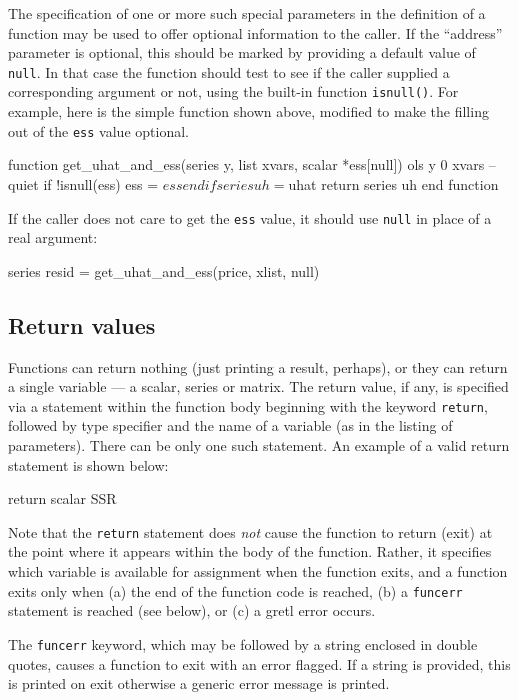 The specification of one or more such special parameters in the
definition of a function may be used to offer optional information to
the caller.  If the ``address'' parameter is optional, this should be
marked by providing a default value of \texttt{null}.  In that case
the function should test to see if the caller supplied a corresponding
argument or not, using the built-in function \texttt{isnull()}.  For
example, here is the simple function shown above, modified to make the
filling out of the \texttt{ess} value optional.
%
\begin{code}
      function get_uhat_and_ess(series y, list xvars, scalar *ess[null])
        ols y 0 xvars --quiet
        if !isnull(ess) 
           ess = $ess
        endif
        series uh = $uhat
        return series uh
      end function
\end{code}
%
If the caller does not care to get the \texttt{ess} value, it should
use \texttt{null} in place of a real argument:
%
\begin{code}
      series resid = get_uhat_and_ess(price, xlist, null)
\end{code}


\subsection{Return values}

Functions can return nothing (just printing a result, perhaps), or
they can return a single variable --- a scalar, series or matrix.  The
return value, if any, is specified via a statement within the function
body beginning with the keyword \verb+return+, followed by type
specifier and the name of a variable (as in the listing of
parameters).  There can be only one such statement.  An example of a
valid return statement is shown below:
%    
\begin{code}
      return scalar SSR
\end{code}
%
Note that the \verb+return+ statement does \emph{not} cause the
function to return (exit) at the point where it appears within the
body of the function. Rather, it specifies which variable is
available for assignment when the function exits, and a function exits
only when (a) the end of the function code is reached, (b) a
\verb+funcerr+ statement is reached (see below), or (c) a gretl error
occurs.
    
The \verb+funcerr+ keyword, which may be followed by a string enclosed
in double quotes, causes a function to exit with an error flagged.  If
a string is provided, this is printed on exit otherwise a generic
error message is printed.
    

